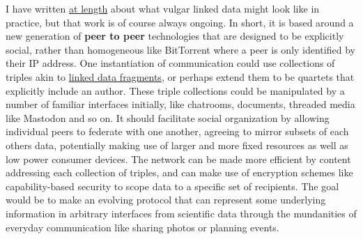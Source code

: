 \documentclass{article}
\begin{document}
I have written \href{https://jon-e.net/infrastructure}{at length} about
what vulgar linked data might look like in practice, but that work is of
course always ongoing. In short, it is based around a new generation of
\textbf{peer to peer} technologies that are designed to be
explicitly social, rather than homogeneous like BitTorrent where a peer
is only identified by their IP address. One instantiation of
communication could use collections of triples akin to
\href{https://linkeddatafragments.org/concept/}{linked data fragments},
or perhaps extend them to be quartets that explicitly include an author.
These triple collections could be manipulated by a number of familiar
interfaces initially, like chatrooms, documents, threaded media like
Mastodon and so on. It should facilitate social organization by allowing
individual peers to federate with one another, agreeing to mirror
subsets of each others data, potentially making use of larger and more
fixed resources as well as low power consumer devices. The network can
be made more efficient by content addressing each collection of triples,
and can make use of encryption schemes like capability-based security to
scope data to a specific set of recipients. The goal would be to make an
evolving protocol that can represent some underlying information in
arbitrary interfaces from scientific data through the mundanities of
everyday communication like sharing photos or planning events.
\end{document}
